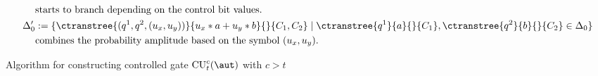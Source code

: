 {\begin{algorithm}[t]
\begin{align*}
&\mbox{starts to branch depending on the control bit values.} \\
\Delta'_0 &:= \{ \ctranstree{(q^1,q^2,(u_x,u_y))}{u_x*a + u_y * b}{}{C_1,C_2} \mid \ctranstree{q^1}{a}{}{C_1},\ctranstree{q^2}{b}{}{C_2} \in \Delta_0 \}\\
&\mbox{combines the probability amplitude based on the symbol $(u_x,u_y)$.}
\end{align*}
\caption{Algorithm for constructing controlled gate $\mathrm{CU}^c_t(\aut)$ with $c>t$}
\label{alg:MultiControlGate}
\end{algorithm}
}


